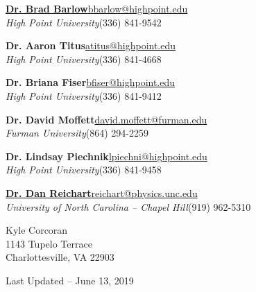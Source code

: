 \documentclass[letterpaper,12pt]{article}
\begin{document}
\vspace{2mm}
\begin{minipage}{6.1in}
\href{http://physics.highpoint.edu/~bbarlow/}{{\large\textbf{Dr. Brad Barlow}}}\hfill \href{mailto:bbarlow@highpoint.edu}{bbarlow@highpoint.edu}\\
\textit{High Point University}\hfill (336) 841-9542

\vspace{3mm}
{\large\textbf{Dr. Aaron Titus}}\hfill \href{mailto:atitus@highpoint.edu}{atitus@highpoint.edu}\\
\textit{High Point University}\hfill (336) 841-4668

\vspace{3mm}
{\large\textbf{Dr. Briana Fiser}}\hfill \href{mailto:bfiser@highpoint.edu}{bfiser@highpoint.edu}\\
\textit{High Point University}\hfill (336) 841-9412

\vspace{3mm}
{\large\textbf{Dr. David Moffett}}\hfill \href{mailto:david.moffett@furman.edu}{david.moffett@furman.edu}\\
\textit{Furman University}\hfill (864) 294-2259

\vspace{3mm}
{\large\textbf{Dr. Lindsay Piechnik}}\hfill \href{mailto:lpiechni@highpoint.edu}{lpiechni@highpoint.edu}\\
\textit{High Point University}\hfill (336) 841-9458

\vspace{3mm}
\href{https://www.danreichart.com/}{{\large\textbf{Dr. Dan Reichart}}}\hfill \href{mailto:reichart@physics.unc.edu}{reichart@physics.unc.edu}\\
\textit{University of North Carolina -- Chapel Hill}\hfill (919) 962-5310
\end{minipage}

\vspace{3mm}
\noindent{}

\vspace{2mm}
\begin{minipage}{6.1in}
Kyle Corcoran\\
1143 Tupelo Terrace\\
Charlottesville, VA 22903
\end{minipage}
\vfill
\begin{center}
    {\tiny Last Updated -- June 13, 2019}
\end{center}
\end{document}
